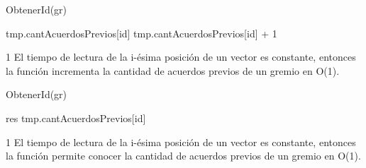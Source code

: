 {
	\state {} \asig ObtenerId(gr)											

	\state tmp.cantAcuerdosPrevios[id] \asig tmp.cantAcuerdosPrevios[id] + 1					
}
{1}
{ El tiempo de lectura de la i-\'esima posici\'on de un vector es constante, entonces la funci\'on incrementa la cantidad de acuerdos previos de un gremio en O(1). }

{
	\state {} \asig ObtenerId(gr)			

	\state res \asig tmp.cantAcuerdosPrevios[id]					
}
{1}
{ El tiempo de lectura de la i-\'esima posici\'on de un vector es constante, entonces la funci\'on permite conocer la cantidad de acuerdos previos de un gremio en O(1). }
